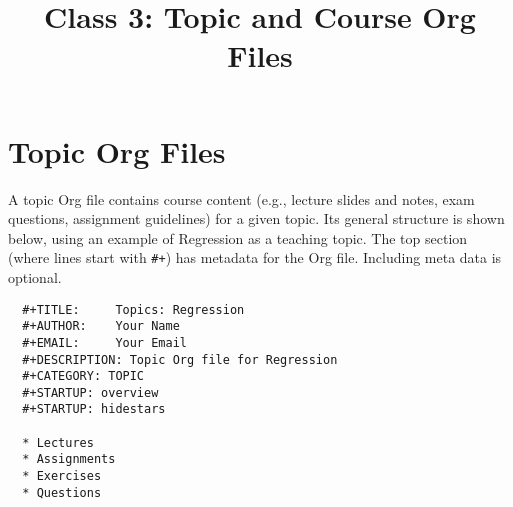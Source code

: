 \documentclass[10pt,article]{article}
\date{\vspace{-6ex}}
\title{Class 3: Topic and Course Org Files}
\begin{document}
\maketitle
{} 
\thispagestyle{fancy}

\setcounter{tocdepth}{1}
\tableofcontents
\vspace{6ex}

\section{Topic Org Files}
\label{sec:org3ddb46a}
A topic Org file contains course content (e.g., lecture slides and
notes, exam questions, assignment guidelines) for a given topic. Its
general structure is shown below, using an example of Regression as a
teaching topic. The top section (where lines start with \texttt{\#+}) has
metadata for the Org file. Including meta data is optional.

\begin{verbatim}
  #+TITLE:     Topics: Regression
  #+AUTHOR:    Your Name
  #+EMAIL:     Your Email
  #+DESCRIPTION: Topic Org file for Regression
  #+CATEGORY: TOPIC
  #+STARTUP: overview
  #+STARTUP: hidestars

  * Lectures
  * Assignments
  * Exercises
  * Questions
\end{verbatim}
\end{document}
